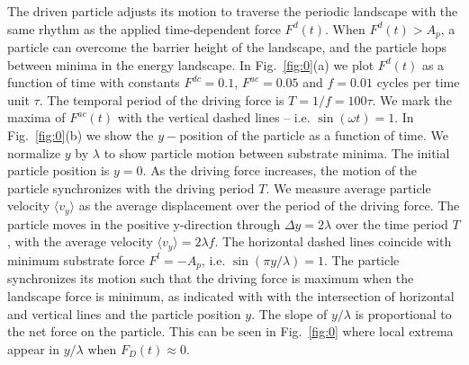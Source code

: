 \documentclass[twocolumn,preprintnumbers,amsmath,amssymb,aps,prx]{revtex4}
\begin{document}
The driven particle adjusts
its motion to traverse
the periodic landscape with the same rhythm as 
the applied time-dependent force $F^d(t)$.
When $F^d(t) > A_p$, a particle can 
overcome the barrier height of the landscape,
and 
the particle hops between minima in the energy landscape.
%
In Fig.~\ref{fig:0}(a)
we plot $F^d(t)$ %
as a function of time with
constants $F^{dc}=0.1$, 
$F^{ac}=0.05$ and $f=0.01$ cycles per time unit $\tau$.
The temporal period of the driving force is
$T = 1/f = 100 \tau$.
We mark the maxima of $F^{ac}(t)$
with the
vertical dashed lines %
-- i.e. $\sin{(\omega t)} = 1$.
%
%
%
In Fig.~\ref{fig:0}(b) 
we show the $y-$position of the particle
as a function of time.
We 
normalize $y$ by $\lambda$ %
to show  particle motion between substrate minima.  
The initial particle position is $y = 0 $. %
As the driving force increases,
the motion of the particle
synchronizes with the driving period $T$.
We measure 
average particle velocity $\langle{v}_y\rangle$
as the average displacement %
over the period of the driving force.
The particle moves
in the positive y-direction
through $\Delta y = 2 \lambda$ over the time period $T$,
with 
the average velocity 
$\langle {v}_y \rangle= 2 \lambda f$. %
The horizontal dashed lines
coincide with %
minimum substrate force  $F^l = -A_p$,  
i.e. $\sin{(\pi y / \lambda)} = 1$.
The particle synchronizes its motion such that the 
driving force is maximum when the landscape 
force is minimum,
as indicated with %
with the intersection of
horizontal and vertical lines
and the particle position $y$.
The slope of $y/\lambda$
is proportional to the net force on the particle.
This can be seen in 
Fig.~\ref{fig:0} %
where local extrema appear in $y/\lambda$
when $F_{D}(t) \approx 0 $. 
\end{document}
